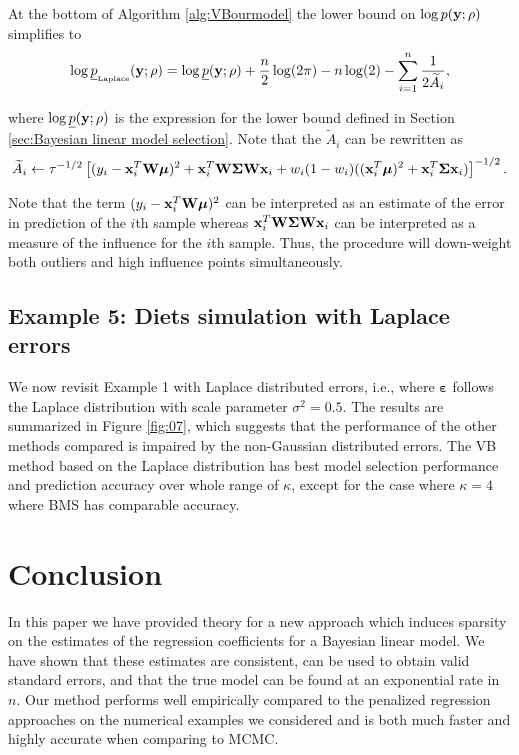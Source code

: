 \documentclass[11pt]{article}
\newtheorem{Main Result}{Main Result}
\def\vectorfontone{\bf}
\def\vectorfonttwo{\boldsymbol}
\def\vx{{\vectorfontone x}}                      %
\def\vy{{\vectorfontone y}}                      %
\def\vvarepsilon{{\vectorfonttwo \varepsilon}}   %
\def\vmu{{\vectorfonttwo \mu}}                   %
\def\matrixfontone{\bf}
\def\matrixfonttwo{\boldsymbol}
\def\mW{{\matrixfontone W}}                      %
\def\mSigma{{\matrixfonttwo \Sigma}}             %
\def\ds{\displaystyle}
\begin{document}
{\noindent 
At the bottom of  Algorithm \ref{alg:VBourmodel} the lower bound on
$\log p(\vy;\rho)$ simplifies to
$$
\begin{array}{rl}
\ds \log \underline{p}_{\mbox{\tiny Laplace}}(\vy;\rho)
= \log \underline{p}(\vy;\rho) 
+ \frac{n}{2}\log(2\pi) 
- n\log(2) - \sum_{i=1}^n\frac{1}{2\widetilde{A}_i},
\end{array}
$$

\noindent where $\log \underline{p}(\vy;\rho)$ is the expression for the lower bound 
defined in Section \ref{sec:Bayesian linear model selection}. Note that the 
$\widetilde{A}_i$ can be rewritten as
$$
\ds \widetilde{A}_i \leftarrow
\tau^{-1/2}\left[
(y_i- \vx^T_i\mW\vmu)^2 + \vx_i^T\mW\mSigma\mW\vx_i
 + w_i(1 - w_i)((\vx_i^T\vmu)^2 + \vx_i^T\mSigma\vx_i)
   \right]^{-1/2}.
$$

\noindent Note that the term $(y_i- \vx^T_i\mW\vmu)^2$ can be interpreted as an
estimate of the error in prediction of the $i$th sample whereas $\vx_i^T\mW\mSigma\mW\vx_i$
can be interpreted as a measure of the influence for the $i$th sample. Thus, the 
procedure will down-weight both outliers and high influence points simultaneously.
 

 

  

\subsection{Example 5: Diets simulation with Laplace errors}

We now revisit Example 1 with Laplace distributed errors, i.e., where
$\vvarepsilon$ follows the Laplace distribution with scale parameter $\sigma^2 = 0.5$.
The results are summarized in Figure \ref{fig:07}, which suggests that
the performance of the other methods compared is impaired by the non-Gaussian distributed
errors. The VB method based on the Laplace distribution has best model selection performance
and prediction accuracy over whole range of $\kappa$, except for the case where
$\kappa=4$ where BMS has comparable accuracy.
}

 





\section{Conclusion}
\label{sec:Conclusion}


In this paper we have provided theory for a new approach which induces sparsity
on the estimates of the regression coefficients for a Bayesian linear model.
We have shown that these estimates are consistent, can be used to obtain
valid standard errors, and that the true model can be found at an exponential
rate in $n$. Our method performs well empirically compared to the penalized
regression approaches on the numerical examples we considered and is both much faster and highly accurate when comparing to MCMC.
\end{document}
